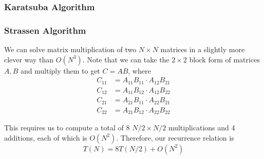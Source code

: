 \documentclass{article}
\begin{document}
    \subsubsection{Karatsuba Algorithm}


    \subsubsection{Strassen Algorithm}

      We can solve matrix multiplication of two $N \times N$ matrices in a slightly more clever way than $O(N^3)$. Note that we can take the $2 \times 2$ block form of matrices $A, B$ and multiply them to get $C = AB$, where 
      \begin{align}
        C_{11} & = A_{11} B_{11} \cdot A_{12} B_{21} \\ 
        C_{12} & = A_{11} B_{12} \cdot A_{12} B_{22} \\ 
        C_{21} & = A_{21} B_{11} \cdot A_{22} B_{21} \\ 
        C_{22} & = A_{21} B_{12} \cdot A_{22} B_{22} 
      \end{align}

      This requires us to compute a total of $8$ $N/2 \times N/2$ multiplications and 4 additions, each of which is $O(N^2)$. Therefore, our recurrence relation is 
      \begin{equation}
        T(N) = 8 T(N/2) + O(N^2)
      \end{equation}
\end{document}
